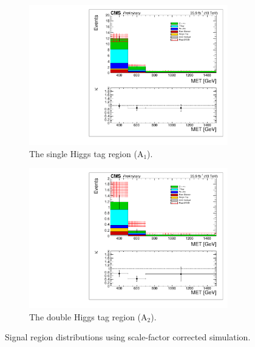 \begin{figure}[hbp!]
\centering
\begin{subfigure}[b]{0.425\textwidth}
\centering
\includegraphics[trim={5px 5px 5px 5px},clip,width=0.95\textwidth]{figs/MCclosureSF_singleHiggsRegionTotal.pdf}
\caption{The single Higgs tag region (A$_{1}$).}
\end{subfigure}
\begin{subfigure}[b]{0.425\textwidth}
\centering
\includegraphics[trim={5px 5px 5px 5px},clip,width=0.95\textwidth]{figs/MCclosureSF_doubleHiggsRegionTotal.pdf} 
\caption{The double Higgs tag region (A$_{2}$).}
\end{subfigure}
\caption{Signal region \ptmiss distributions using scale-factor corrected simulation.}
\label{fig:MCclosuresf}
\end{figure}

